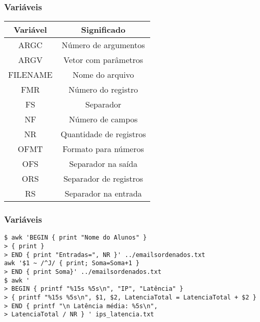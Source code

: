 \documentclass{beamer}
\begin{document}
   \begin{frame}
      \frametitle{Variáveis}
      \begin{table}
         \begin{tabular}{c|c}
         Variável & Significado \\
         \hline 
	 ARGC     &  Número de argumentos\\
	 ARGV     &  Vetor com parâmetros\\
	 FILENAME &  Nome do arquivo\\
	 FMR      &  Número do registro\\
	 FS       &  Separador \\
	 NF       &  Número de campos \\
	 NR       &  Quantidade de registros\\
	 OFMT     &  Formato para números\\
	 OFS      &  Separador na saída\\
	 ORS      &  Separador de registros\\
	 RS       &  Separador na entrada\\ 
         \end{tabular}
      \end{table}
   \end{frame}

   \begin{frame}[fragile]
      \frametitle{Variáveis}
      \footnotesize
      \begin{verbatim}
$ awk 'BEGIN { print "Nome do Alunos" }
> { print }
> END { print "Entradas=", NR }' ../emailsordenados.txt
awk '$1 ~ /^J/ { print; Soma=Soma+1 } 
> END { print Soma}' ../emailsordenados.txt
$ awk '
> BEGIN { printf "%15s %5s\n", "IP", "Latência" }
> { printf "%15s %5s\n", $1, $2, LatenciaTotal = LatenciaTotal + $2 }
> END { printf "\n Latência média: %5s\n", 
> LatenciaTotal / NR } ' ips_latencia.txt
      \end{verbatim}
\end{frame}
\end{document}
